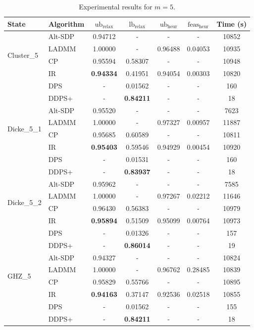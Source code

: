 \documentclass[smallextended]{svjour3}
\newcommand{\1}{\mathbf{1}}
\newcommand{\heur}{\text{heur}}
\newcommand{\relx}{\text{relax}}
\newcommand{\lb}{\text{lb}}
\newcommand{\ub}{\text{ub}}
\newcommand{\feas}{\text{feas}}
\begin{document}
\begin{table}[htb]
\centering
\begin{tabular}{l|l|ccccc}
\toprule
    \textbf{State} & \textbf{Algorithm} & $\ub_{\relx}$ & $\lb_{\relx}$ & $\ub_{\heur}$ & $\feas_{\heur}$ & \textbf{Time (s)} \\
\toprule
 \multirow{4}{*}{Cluster\_5}
& Alt-SDP & 0.94712 & - & - & - & 10852 \\
 & LADMM & 1.00000 & - & 0.96488 & 0.04053 & 10935 \\
 & CP & 0.95594 & 0.58307 & - & - & 10948 \\
 & IR & \textbf{0.94334} & 0.41951 & 0.94054 & 0.00303 & 10820 \\
 & DPS & - & 0.01562 & - & - & 160 \\
 & DDPS+ & - & \textbf{0.84211} & - & - & 18 \\

\midrule
 \multirow{4}{*}{Dicke\_5\_1}
& Alt-SDP & 0.95520 & - & - & - & 7623 \\
 & LADMM & 1.00000 & - & 0.97327 & 0.00957 & 11887 \\
 & CP & 0.95685 & 0.60589 & - & - & 10811 \\
 & IR & \textbf{0.95403} & 0.59546 & 0.94929 & 0.00454 & 10920 \\
 & DPS & - & 0.01531 & - & - & 160 \\
 & DDPS+ & - & \textbf{0.83937} & - & - & 18 \\

\midrule
 \multirow{4}{*}{Dicke\_5\_2}
& Alt-SDP & 0.95962 & - & - & - & 7585 \\
 & LADMM & 1.00000 & - & 0.97267 & 0.02212 & 11646 \\
 & CP & 0.96430 & 0.56383 & - & - & 10979 \\
 & IR & \textbf{0.95894} & 0.51509 & 0.95099 & 0.00764 & 10973 \\
 & DPS & - & 0.01326 & - & - & 157 \\
 & DDPS+ & - & \textbf{0.86014} & - & - & 19 \\

\midrule
 \multirow{4}{*}{GHZ\_5}
& Alt-SDP & 0.94327 & - & - & - & 10824 \\
 & LADMM & 1.00000 & - & 0.96762 & 0.28485 & 10839 \\
 & CP & 0.95829 & 0.55766 & - & - & 10895 \\
 & IR & \textbf{0.94163} & 0.37147 & 0.92536 & 0.02518 & 10855 \\
 & DPS & - & 0.01562 & - & - & 155 \\
  & DDPS+ & - &\textbf{0.84211} & - & - & 18 \\
\bottomrule

\end{tabular}
\caption{Experimental results for $m=5$.}
\label{tab.m5}
\end{table}
\end{document}
